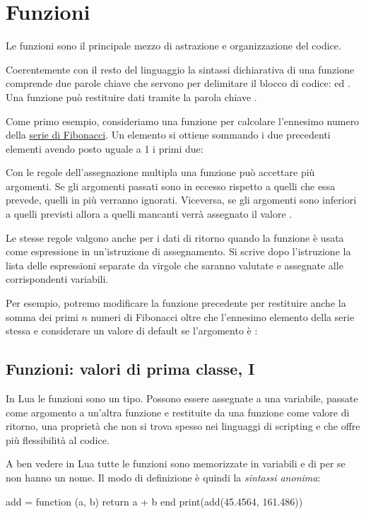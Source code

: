 
\chapter{Funzioni}

Le funzioni sono il principale mezzo di astrazione e organizzazione del codice.

Coerentemente con il resto del linguaggio la sintassi dichiarativa di una
funzione comprende due parole chiave che servono per delimitare il blocco di
codice:  ed . Una funzione può restituire dati tramite la
parola chiave .

Come primo esempio, consideriamo una funzione per calcolare l'ennesimo numero
della \href{http://it.wikipedia.org/wiki/Successione_di_Fibonacci}{serie di
Fibonacci}. Un elemento si ottiene sommando i due precedenti elementi avendo
posto uguale a 1 i primi due:

Con le regole dell'assegnazione multipla una funzione può accettare più
argomenti. Se gli argomenti passati sono in eccesso rispetto a quelli che essa
prevede, quelli in più verranno ignorati. Viceversa, se gli argomenti sono
inferiori a quelli previsti allora a quelli mancanti verrà assegnato il valore
.

Le stesse regole valgono anche per i dati di ritorno quando la funzione è usata
come espressione in un'istruzione di assegnamento. Si scrive dopo l'istruzione
 la lista delle espressioni separate da virgole che saranno valutate
e assegnate alle corrispondenti variabili.

Per esempio, potremo modificare la funzione precedente per restituire anche la
somma dei primi \( n \) numeri di Fibonacci oltre che l'ennesimo elemento della
serie stessa e considerare un valore di default se l'argomento è :


\section{Funzioni: valori di prima classe, I}

In Lua le funzioni sono un tipo. Possono essere assegnate a una variabile,
passate come argomento a un'altra funzione e restituite da una funzione come
valore di ritorno, una proprietà che non si trova spesso nei linguaggi di
scripting e che offre più flessibilità al codice.

A ben vedere in Lua tutte le funzioni sono memorizzate in variabili e di per se
non hanno un nome. Il modo di definizione è quindi la \emph{sintassi anonima}:
\begin{lines}
add = function (a, b)
    return a + b
end
print(add(45.4564, 161.486))
\end{lines}

